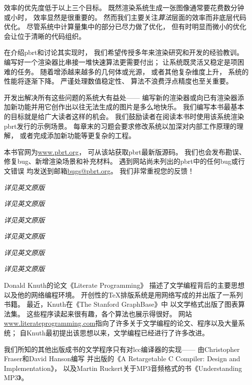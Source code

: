 效率的优先度低于以上三个目标。
既然渲染系统生成一张图像通常要花费数分钟或小时，
效率显然是很重要的。
然而我们主要关注{\itshape 算法}层面的效率而非底层代码优化。
尽管系统中计算量集中的部分已尽力做了优化，
但有时明显而微小的优化会让位于清晰的代码组织。

在介绍pbrt和讨论其实现时，
我们希望传授多年来渲染研究和开发的经验教训。
编写好一个渲染器比串接一堆快速算法更需要付出；
让系统既灵活又稳定是项困难的任务。
随着增添越来越多的几何体或光源，
或者其他复杂维度上升，
系统的性能将逐渐下降。
严谨处理数值稳定性、
算法不浪费浮点精度也至关重要。

开发出解决所有这些问题的系统大有益处——
编写新的渲染器或向已有渲染器添加新功能并用它创作出以往无法生成的图片是多么地快乐。
我们编写本书最基本的目标就是给广大读者这样的机会。
我们鼓励读者在阅读本书时使用该系统渲染pbrt发行的示例场景。
每章末的习题会要求修改系统以加深对内部工作原理的理解，
或者完成添加新功能等更复杂的工程。

本书官网为\url{www.pbrt.org}，
可从该站获取pbrt最新版源码。
我们也会发布勘误、修复bug、新增渲染场景和补充材料。
遇到网站尚未列出的pbrt中的任何bug或行文错误
均发送到邮箱\href{mailto:bugs@pbrt.org}{\url{bugs@pbrt.org}}。
我们非常重视您的反馈！\\


{\itshape 详见英文原版}\\


{\itshape 详见英文原版}\\


{\itshape 详见英文原版}\\


{\itshape 详见英文原版}\\


{\itshape 详见英文原版}\\


{\itshape 详见英文原版}\\


Donald Knuth的论文《Literate Programming》\citep{10.1093/comjnl/27.2.97}
描述了文学编程背后的主要思想以及他的网络编程环境。
开创性的\TeX 排版系统是用网络写成的并出版了一系列书籍\citep{10.5555/536126,10.5555/536123}。
最近，Knuth在《The Stanford GraphBase》\citep{10.1145/164984}中
以文学格式出版了图表算法集。
这些程序读起来很有趣，各个算法也展示得很好。
网站\url{www.literateprogramming.com}指向了许多关于文学编程的论文、程序以及大量系统；
自Knuth最初提出该思想以来，文学编程已经进行了许多改进。


我们所知的其他出版成书的文学程序只有对lcc编译器的实现——
由Christopher Fraser和David Hanson编写
并出版的《A Retargetable C Compiler: Design and Implementation》\citep{10.5555/555424}，
以及Martin Ruckert关于MP3音频格式的书《Understanding MP3》\citep{10.5555/1036653}。

